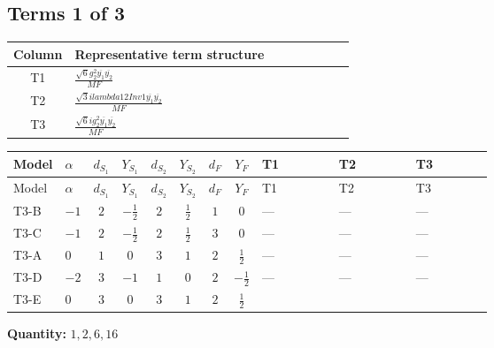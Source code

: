\documentclass[8pt]{article}
\begin{document}
\begin{landscape}
\subsection*{Terms 1 of 3}
\begin{center}
\begin{tabular}{@{}c >{\raggedright\arraybackslash}p{0.82\linewidth}@{}}
\toprule
Column & Representative term structure \\
\midrule
T1 & \(\displaystyle \frac{\sqrt{6} g_{2}^{2} \overline{y_{1}} \overline{y_{2}}}{MF}\) \\
\midrule
T2 & \(\displaystyle \frac{\sqrt{3} i lambda12Inv1 \overline{y_{1}} \overline{y_{2}}}{MF}\) \\
\midrule
T3 & \(\displaystyle \frac{\sqrt{6} i g_{2}^{2} \overline{y_{1}} \overline{y_{2}}}{MF}\) \\
\midrule
\bottomrule
\end{tabular}
\end{center}
\smallskip
\tiny
\begin{longtable}{@{}llcccccc >{\raggedright\arraybackslash}p{0.21\linewidth} >{\raggedright\arraybackslash}p{0.21\linewidth} >{\raggedright\arraybackslash}p{0.21\linewidth}@{}}
\toprule
Model & $\alpha$ & $d_{S_1}$ & $Y_{S_1}$ & $d_{S_2}$ & $Y_{S_2}$ & $d_F$ & $Y_F$ & T1 & T2 & T3 \\
\midrule
\endfirsthead
\toprule
Model & $\alpha$ & $d_{S_1}$ & $Y_{S_1}$ & $d_{S_2}$ & $Y_{S_2}$ & $d_F$ & $Y_F$ & T1 & T2 & T3 \\
\midrule
\endhead
T3-B & $-1$ & $2$ & $-\frac{1}{2}$ & $2$ & $\frac{1}{2}$ & $1$ & $0$ & --- & --- & --- \\
\midrule
T3-C & $-1$ & $2$ & $-\frac{1}{2}$ & $2$ & $\frac{1}{2}$ & $3$ & $0$ & --- & --- & --- \\
\midrule
T3-A & $0$ & $1$ & $0$ & $3$ & $1$ & $2$ & $\frac{1}{2}$ & --- & --- & --- \\
\midrule
T3-D & $-2$ & $3$ & $-1$ & $1$ & $0$ & $2$ & $-\frac{1}{2}$ & --- & --- & --- \\
\midrule
T3-E & $0$ & $3$ & $0$ & $3$ & $1$ & $2$ & $\frac{1}{2}$ & \scriptsize\adjustbox{max width=\linewidth}{$\begin{gathered} - \frac{\sqrt{6} g_{2}^{2} \overline{y_{1}} \overline{y_{2}}}{6 MF}\end{gathered}$} & \scriptsize\adjustbox{max width=\linewidth}{$\begin{gathered} - \frac{\sqrt{3} i lambda12Inv1 \overline{y_{1}} \overline{y_{2}}}{6 MF}\end{gathered}$} & \scriptsize\adjustbox{max width=\linewidth}{$\begin{gathered} \frac{\sqrt{6} i g_{2}^{2} \overline{y_{1}} \overline{y_{2}}}{6 MF}\end{gathered}$} \\
\midrule
\bottomrule
\end{longtable}
\clearpage
\noindent\textbf{Quantity: }$\mathrm{1,2,6,16}$\par\smallskip

\end{landscape}
\end{document}
